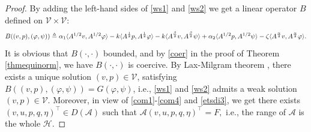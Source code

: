 \documentclass[12pt,reqno]{article}
\begin{document}
\begin{proof}
		By adding the left-hand sides of \eqref{ws1} and \eqref{ws2} we get a linear operator $B$ defined on $\mathcal{V}\times\mathcal{V}$:
		\[
		B((v,p),(\varphi,\psi)) \triangleq\alpha_1 \langle A^{1/2}v,A^{1/2}\varphi\rangle
		- k\langle A^{\frac{1}{2}}p,A^{\frac{1}{2}}\varphi\rangle
		- k\langle A^{\frac{\beta}{2}}v,A^{\frac{\beta}{2}}\psi\rangle \\
		+\alpha_2 \langle A^{1/2}p,A^{1/2}\psi\rangle
		- \zeta\langle A^{\frac{\alpha}{2}}v,A^{\frac{\alpha}{2}}\varphi\rangle.
		\]
		It is obvious that $B(\cdot,\cdot)$ bounded, and by \eqref{coer} in the proof of Theorem \ref{thmequinorm}, we have $B(\cdot,\cdot)$ is coercive. By Lax-Milgram theorem \cite{MR2759829}, there exists a unique solution $(v,p)\in \mathcal{V}$, satisfying $B((v,p),(\varphi,\psi)) = G(\varphi,\psi)$, i.e., \eqref{ws1} and \eqref{ws2} admits a weak solution $(v,p)\in \mathcal{V}$. Moreover, in view of \eqref{com1}-\eqref{com4} and \eqref{etsdi3}, we get there exists $(v,u,p,q,\eta)^\top \in D(\mathcal{A})$ such that \(
		\mathcal{A}(v,u,p,q,\eta)^\top = F,
		\) i.e., the range of $\mathcal{A}$ is the whole $\mathcal{H}$.
		

\end{proof}
\end{document}
